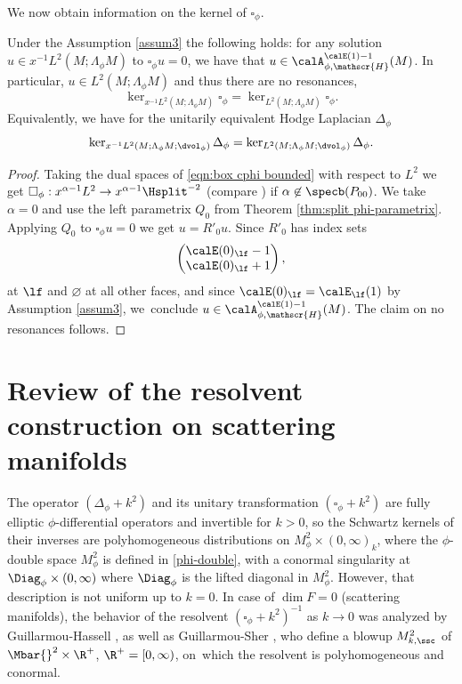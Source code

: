 We now obtain information on the kernel of $\square_\phi$.
\begin{Cor}
\label{cor:kernel}
Under the Assumption \ref{assum3} the following holds:
for any solution $u\in x^{-1}L^2(M;\Lambda_\phi M)$ to $\square_\phi u=0$, we have that
$u\in \calA_{\phi,\mathscr{H}}^{\calE(1)-1}(M)$. In particular, $u\in L^2(M;\Lambda_\phi M)$ and thus
there are no resonances, \ie\vspace*{-3pt}
\[
\ker_{x^{-1}L^2(M;\Lambda_\phi M)} \square_\phi = \ker_{L^2(M;\Lambda_\phi M)} \square_\phi.
\]
Equivalently, we have for the unitarily equivalent Hodge Laplacian $\Delta_{\phi}$\vspace*{-3pt}
\[
\ker_{x^{-1}L^2(M;\Lambda_\phi M; \dvol_\phi)} \Delta_{\phi} = \ker_{L^2(M; \Lambda_\phi M;\dvol_\phi)} \Delta_{\phi}.
\]
\end{Cor}
\begin{proof}
Taking the dual spaces of \eqref{eqn:box cphi bounded} with respect to $L^2$ we get
$\square_\phi: x^{\alpha-1}L^2 \to x^{\alpha-1} \Hsplit^{-2}$
(compare \cite[Th.\,13]{grieser-para}) if $\alpha\not\in \specb(P_{00})$. We take $\alpha=0$ and use the left parametrix $Q_0$ from Theorem \ref{thm:split phi-parametrix}. Applying $Q_0$ to $\square_\phi u=0$ we get $u=R'_0u$. Since
$R'_0$ has index sets
\[
\begin{pmatrix}
\calE(0)_\lf-1 \\ \calE(0)_\lf+1
\end{pmatrix},
\]
at $\lf$ and $\varnothing$ at all other faces, and since $\calE(0)_\lf=\calE_\lf(1)$ by Assumption \ref{assum3},
we~conclude $u\in \calA_{\phi,\mathscr{H}}^{\calE(1)-1}(M)$. The claim on no resonances follows.
\end{proof}

\section{Review of the resolvent construction on scattering manifolds}
\label{section 3}
The operator $(\Delta_{\phi} + k^2)$ and its unitary transformation
$(\square_{\phi} + k^2)$ are fully elliptic $\phi$\nobreakdash-differential operators and invertible for $k>0$, so the Schwartz kernels of their inverses are
polyhomogeneous distributions on $M^2_\phi \times (0,\infty)_k$, where
the $\phi$-double space $M_\phi^2$ is defined in \eqref{phi-double}, with a conormal singularity at $\Diag_\phi\times(0,\infty)$ where $\Diag_\phi$ is the lifted diagonal in $M^2_\phi$. However, that description
is not uniform up to $k=0$. In case of $\dim F = 0$ (scattering manifolds), the behavior of the resolvent $(\square_{\phi} + k^2)^{-1}$
as $k\to 0$ was analyzed by Guillarmou-Hassell \cite{guillarmou2008resolvent, guillarmou2009resolvent},
as well as Guillarmou-Sher \cite{guillarmou2014low}, who define
a blowup $M^2_{k, \ssc}$ of $\Mbar{}^2 \times \R^+$, $\R^+=[0,\infty)$,
on~which the resolvent is polyhomogeneous and conormal.

